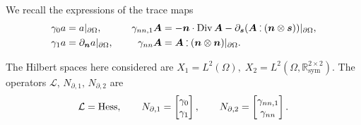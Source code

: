 We recall the expressions of the trace maps
\begin{equation}
\begin{aligned}
\gamma_{0}a &= a\vert_{\partial\Omega}, \\
\gamma_{1}a &= \partial_{\bm{n}} a \vert_{\partial\Omega},
\end{aligned}\qquad
\begin{aligned}
\gamma_{nn, 1}\bm{A} &= -\bm{n} \cdot \Div \bm{A} - \partial_{\bm{s}} (\bm{A} \cddot (\bm{n} \otimes \bm{s}))\vert_{\partial\Omega}, \\
\gamma_{nn}\bm{A} &= \bm{A} \cddot (\bm{n} \otimes \bm{n})\vert_{\partial\Omega}.
\end{aligned}
\end{equation}

The Hilbert spaces here considered are $X_1=L^2(\Omega), \;  X_2=L^2(\Omega, \mathbb{R}^{2\times 2}_{\text{sym}})$. The  operators $\mathcal{L}, \, N_{\partial, 1}, \, N_{\partial, 2}$ are
\begin{equation}
\mathcal{L}= \operatorname*{Hess}, \qquad
N_{\partial, 1} = \begin{bmatrix}
\gamma_0 \\ \gamma_1
\end{bmatrix}, \qquad 
N_{\partial, 2} = \begin{bmatrix}
\gamma_{nn,1} \\ \gamma_{nn}
\end{bmatrix}.
\end{equation}

